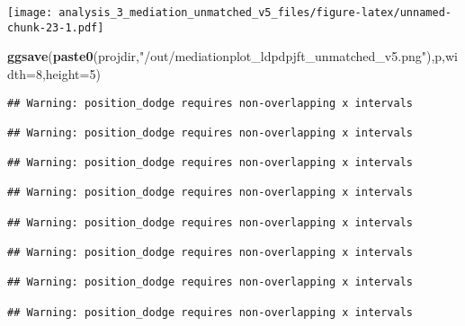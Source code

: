 \documentclass[
]{article}
\newenvironment{Shaded}{\begin{snugshade}}{\end{snugshade}}
\newcommand{\DataTypeTok}[1]{\textcolor[rgb]{0.13,0.29,0.53}{#1}}
\newcommand{\DecValTok}[1]{\textcolor[rgb]{0.00,0.00,0.81}{#1}}
\newcommand{\KeywordTok}[1]{\textcolor[rgb]{0.13,0.29,0.53}{\textbf{#1}}}
\newcommand{\NormalTok}[1]{#1}
\newcommand{\StringTok}[1]{\textcolor[rgb]{0.31,0.60,0.02}{#1}}
\begin{document}
\texttt{[image: analysis\_3\_mediation\_unmatched\_v5\_files/figure-latex/unnamed-chunk-23-1.pdf]}

\begin{Shaded}
\begin{Highlighting}[]
\KeywordTok{ggsave}\NormalTok{(}\KeywordTok{paste0}\NormalTok{(projdir,}\StringTok{"/out/mediationplot_ldpdpjft_unmatched_v5.png"}\NormalTok{),p,}\DataTypeTok{width=}\DecValTok{8}\NormalTok{,}\DataTypeTok{height=}\DecValTok{5}\NormalTok{)}
\end{Highlighting}
\end{Shaded}

\begin{verbatim}
## Warning: position_dodge requires non-overlapping x intervals

## Warning: position_dodge requires non-overlapping x intervals

## Warning: position_dodge requires non-overlapping x intervals

## Warning: position_dodge requires non-overlapping x intervals

## Warning: position_dodge requires non-overlapping x intervals

## Warning: position_dodge requires non-overlapping x intervals

## Warning: position_dodge requires non-overlapping x intervals

## Warning: position_dodge requires non-overlapping x intervals
\end{verbatim}
\end{document}
